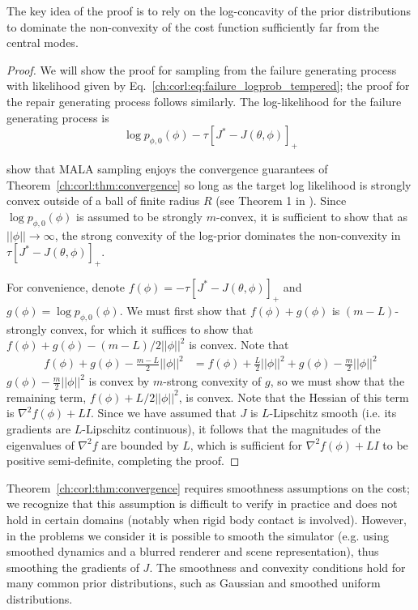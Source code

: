 The key idea of the proof is to rely on the log-concavity of the prior distributions to dominate the non-convexity of the cost function sufficiently far from the central modes.

\begin{proof}
    We will show the proof for sampling from the failure generating process with likelihood given by Eq.~\eqref{ch:corl:eq:failure_logprob_tempered}; the proof for the repair generating process follows similarly. The log-likelihood for the failure generating process is
    \begin{equation}
        \log p_{\phi, 0}(\phi) - \tau [J^* - J(\theta, \phi)]_+ \label{ch:corl:eq:failure_logprob}
    \end{equation}

    \cite{maSamplingCanBe2019} show that MALA sampling enjoys the convergence guarantees of Theorem~\ref{ch:corl:thm:convergence} so long as the target log likelihood is strongly convex outside of a ball of finite radius $R$ (see Theorem 1 in \cite{maSamplingCanBe2019}). Since $\log p_{\phi, 0}(\phi)$ is assumed to be strongly $m$-convex, it is sufficient to show that as $||\phi|| \to \infty$, the strong convexity of the log-prior dominates the non-convexity in $\tau [J^* - J(\theta, \phi)]_+$.

    For convenience, denote $f(\phi) = -\tau [J^* - J(\theta, \phi)]_+$ and $g(\phi) = \log p_{\phi, 0}(\phi)$. We must first show that $f(\phi) + g(\phi)$ is $(m-L)$-strongly convex, for which it suffices to show that $f(\phi) + g(\phi) - (m-L)/2 ||\phi||^2$ is convex. Note that
    \begin{align}
        f(\phi) + g(\phi) - \frac{m-L}{2} ||\phi||^2 & = f(\phi) + \frac{L}{2} ||\phi||^2 + g(\phi) - \frac{m}{2} ||\phi||^2
    \end{align}
    $g(\phi) - \frac{m}{2} ||\phi||^2$ is convex by $m$-strong convexity of $g$, so we must show that the remaining term, $f(\phi) + L/2 ||\phi||^2$, is convex. Note that the Hessian of this term is $\nabla^2 f(\phi) + LI$. Since we have assumed that $J$ is $L$-Lipschitz smooth (i.e. its gradients are $L$-Lipschitz continuous), it follows that the magnitudes of the eigenvalues of $\nabla^2 f$ are bounded by $L$, which is sufficient for $\nabla^2 f(\phi) + LI$ to be positive semi-definite, completing the proof.
\end{proof}

Theorem~\ref{ch:corl:thm:convergence} requires smoothness assumptions on the cost; we recognize that this assumption is difficult to verify in practice and does not hold in certain domains (notably when rigid body contact is involved). However, in the problems we consider it is possible to smooth the simulator (e.g. using smoothed dynamics and a blurred renderer and scene representation), thus smoothing the gradients of $J$. The smoothness and convexity conditions hold for many common prior distributions, such as Gaussian and smoothed uniform distributions.

